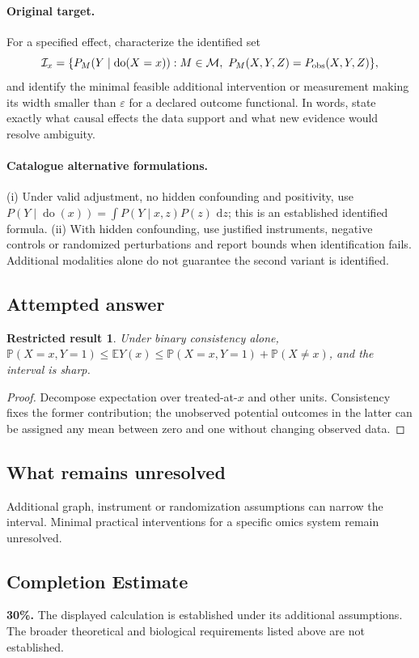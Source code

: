 \documentclass[11pt]{article}
\newcommand{\E}{\mathbb E}
\newcommand{\Prob}{\mathbb P}
\newcommand{\dd}{\,\mathrm d}
\providecommand{\E}{\mathbb E}
\providecommand{\Prob}{\mathbb P}
\newtheorem{attemptresult}{Restricted result}[section]
\begin{document}
\paragraph{Original target.}
For a specified effect, characterize the identified set
\[
\mathcal I_x=\{P_M(Y\mid\operatorname{do}(X=x)):M\in\mathcal M,
\ P_M(X,Y,Z)=P_{\rm obs}(X,Y,Z)\},
\]
and identify the minimal feasible additional intervention or measurement making its width smaller than $\varepsilon$ for a declared outcome functional. In words, state exactly what causal effects the data support and what new evidence would resolve ambiguity.
\paragraph{Catalogue alternative formulations.}
(i) Under valid adjustment, no hidden confounding and positivity, use $P(Y\mid\operatorname{do}(x))=\int P(Y\mid x,z)P(z)\,\dd z$; this is an established identified formula. (ii) With hidden confounding, use justified instruments, negative controls or randomized perturbations and report bounds when identification fails. Additional modalities alone do not guarantee the second variant is identified.
\subsection{Attempted answer}
\begin{attemptresult}
Under binary consistency alone, $\Prob(X=x,Y=1)\leq\E Y(x)\leq\Prob(X=x,Y=1)+\Prob(X\ne x)$, and the interval is sharp.
\end{attemptresult}
\begin{proof}
Decompose expectation over treated-at-$x$ and other units. Consistency fixes the former contribution; the unobserved potential outcomes in the latter can be assigned any mean between zero and one without changing observed data.
\end{proof}
\subsection{What remains unresolved}
Additional graph, instrument or randomization assumptions can narrow the interval. Minimal practical interventions for a specific omics system remain unresolved.
\subsection{Completion Estimate}
\textbf{30\%.} The displayed calculation is established under its additional assumptions. The broader theoretical and biological requirements listed above are not established.
\end{document}

